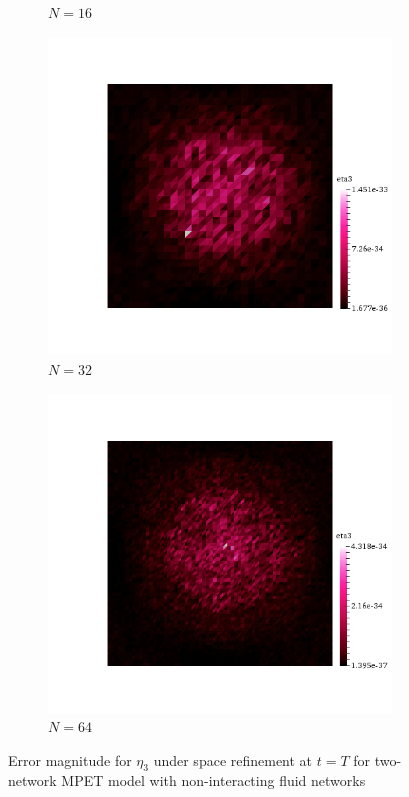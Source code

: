 \begin{figure}[h!]
\begin{subfigure}[b]{0.24\textwidth}
    \caption{$N=16$}
  \end{subfigure}
  \begin{subfigure}[b]{0.24\textwidth}
    \includegraphics[width=\textwidth,height=\textheight,keepaspectratio,height=\textheight,keepaspectratio]{figures/2_mpet/no_transfer/space/eta3_32.png}
    \caption{$N=32$}
  \end{subfigure}
  \begin{subfigure}[b]{0.24\textwidth}
    \includegraphics[width=\textwidth,height=\textheight,keepaspectratio,height=\textheight,keepaspectratio]{figures/2_mpet/no_transfer/space/eta3_64.png}
    \caption{$N=64$}
  \end{subfigure}
  \caption{Error magnitude for $\eta_3$ under space refinement at $t=T$ for two-network MPET model with non-interacting fluid networks} \label{fig:bb_no_transfer_eta3}
\end{figure}
